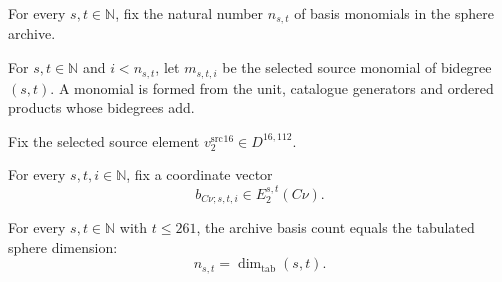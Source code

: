 \begin{definition}
\label{frontier:E2Computation:c04b5bfa5c79}
For every $s,t\in\mathbb N$, fix the natural number $n_{s,t}$ of basis monomials in the sphere archive.
\end{definition}

\begin{definition}
\label{frontier:E2Computation:ca5f76beefcc}
For $s,t\in\mathbb N$ and $i<n_{s,t}$, let $m_{s,t,i}$ be the selected source monomial of bidegree $(s,t)$. A monomial is formed from the unit, catalogue generators and ordered products whose bidegrees add.
\end{definition}

\begin{definition}
\label{frontier:E2Computation:cd42dbe2a65b}
Fix the selected source element $v^{\mathrm{src}}_2{}^{16}\in D^{16,112}$.
\end{definition}

\begin{definition}
\label{frontier:E2Computation:762f8710f8d1}
For every $s,t,i\in\mathbb N$, fix a coordinate vector
\[b_{C\nu;s,t,i}\in E_2^{s,t}(C\nu).\]
\end{definition}

\begin{theorem}
\label{frontier:E2Computation:75f3d8ca6b5b}
For every $s,t\in\mathbb N$ with $t\leq261$, the archive basis count equals the tabulated sphere dimension:
\[n_{s,t}=\operatorname{dim}_{\mathrm{tab}}(s,t).\]
\end{theorem}

